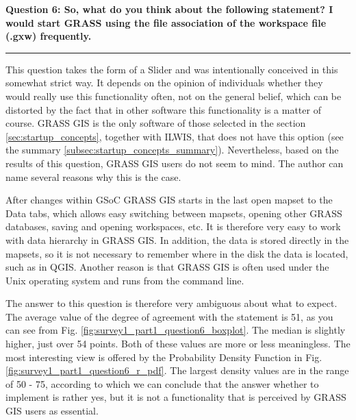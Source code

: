 \documentclass[a4paper,10pt,twoside]{article}
\begin{document}
\newpage
\noindent \textbf{Question 6: So, what do you think about the following statement? I would start GRASS using the file association of the workspace file (.gxw) frequently.}
\par\noindent\rule{\textwidth}{0.4pt}
\noindent This question takes the form of a Slider and was intentionally conceived in this somewhat strict way. It depends on the opinion of individuals whether they would really use this functionality often, not on the general belief, which can be distorted by the fact that in other software this functionality is a matter of course. GRASS GIS is the only software of those selected in the section \ref{sec:startup_concepts}, together with ILWIS, that does not have this option (see the summary \ref{subsec:startup_concepts_summary}). Nevertheless, based on the results of this question, GRASS GIS users do not seem to mind. The author can name several reasons why this is the case.

After changes within GSoC GRASS GIS starts in the last open mapset to the Data tabs, which allows easy switching between mapsets, opening other GRASS databases, saving and opening workspaces, etc. It is therefore very easy to work with data hierarchy in GRASS GIS. In addition, the data is stored directly in the mapsets, so it is not necessary to remember where in the disk the data is located, such as in QGIS. Another reason is that GRASS GIS is often used under the Unix operating system and runs from the command line.

The answer to this question is therefore very ambiguous about what to expect. The average value of the degree of agreement with the statement is 51, as you can see from Fig. \ref{fig:survey1_part1_question6_boxplot}. The median is slightly higher, just over 54 points. Both of these values are more or less meaningless. The most interesting view is offered by the Probability Density Function in Fig. \ref{fig:survey1_part1_question6_r_pdf}. The largest density values are in the range of 50 - 75, according to which we can conclude that the answer whether to implement is rather yes, but it is not a functionality that is perceived by GRASS GIS users as essential.
\end{document}

